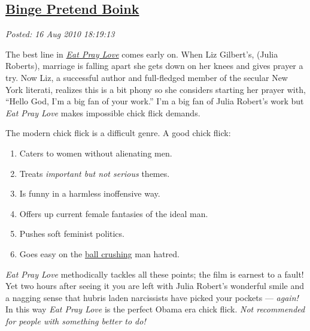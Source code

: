 %

\subsection*{\href{https://bakerjd99.wordpress.com/2010/08/16/binge-pretend-boink/}{Binge Pretend Boink}}


\noindent\emph{Posted: 16 Aug 2010 18:19:13}
\vspace{6pt}



The best line
in \href{http://www.rottentomatoes.com/m/eat\_pray\_love/}{\emph{Eat
Pray Love}} comes early on. When Liz Gilbert's, (Julia Roberts),
marriage is falling apart she gets down on her knees and gives prayer a
try. Now Liz, a successful author and full-fledged member of the secular
New York literati, realizes this is a bit phony so she considers
starting her prayer with, ``Hello God, I'm a big fan of your work.'' I'm
a big fan of Julia Robert's work but \emph{Eat Pray Love} makes
impossible chick flick demands.

The modern chick flick is a difficult genre. A good chick flick:

\begin{enumerate}
\tightlist
\item
  Caters to women without alienating men.
\item
  Treats \emph{important but not serious} themes.
\item
  Is funny in a harmless inoffensive way.
\item
  Offers up current female fantasies of the ideal man.
\item
  Pushes soft feminist politics.
\item
  Goes easy on the
  \href{http://www.urbandictionary.com/define.php?term=ball\%20crush}{ball
  crushing} man hatred.
\end{enumerate}
\emph{Eat Pray Love} methodically tackles all these points; the film is
earnest to a fault! Yet two hours after seeing it you are left with
Julia Robert's wonderful smile and a nagging sense that hubris laden
narcissists have picked your pockets --- \emph{again!} In this way
\emph{Eat Pray Love} is the perfect Obama era chick flick. \emph{Not
recommended for people with something better to do!}

